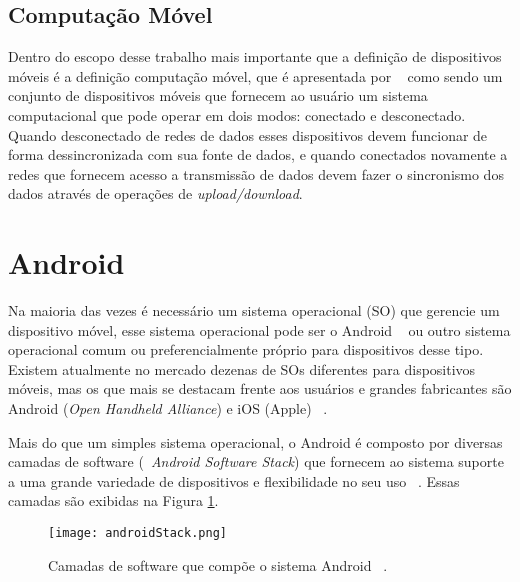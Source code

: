     
    \subsection{Computação Móvel}
    Dentro do escopo desse trabalho mais importante que a definição de dispositivos móveis é a definição  computação móvel, que é apresentada por ~\cite{mobileDevices} como sendo um conjunto de dispositivos móveis que fornecem ao usuário um sistema computacional que pode operar em dois modos: conectado e desconectado. Quando desconectado de redes de dados esses dispositivos devem funcionar de forma dessincronizada com sua fonte de dados, e quando conectados novamente a redes que fornecem acesso a transmissão de dados devem fazer o sincronismo dos dados através de operações de \textit{upload/download}.
    
    
\section{Android}

Na maioria das vezes é necessário um sistema operacional (SO) que gerencie um dispositivo móvel, esse sistema operacional pode ser o Android ~\cite{android} ou outro sistema operacional comum ou preferencialmente próprio para dispositivos desse tipo. Existem atualmente no mercado dezenas de SOs diferentes para dispositivos móveis, mas os que mais se destacam frente aos usuários e grandes fabricantes são Android (\textit{Open Handheld Alliance}) e iOS (Apple) ~\cite{mobileDevicesMarketShare}.

Mais do que um simples sistema operacional, o Android é composto por diversas camadas de software (~\textit{Android Software Stack}) que fornecem ao sistema suporte a uma grande variedade de dispositivos e flexibilidade no seu uso ~\cite{android}. Essas camadas são exibidas na Figura \ref{fig:androidStack}.

\begin{figure}[h]
\centering
\texttt{[image: androidStack.png]}
\caption{Camadas de software que compõe o sistema Android ~\cite{android}.}
\label{fig:androidStack}
\end{figure}

